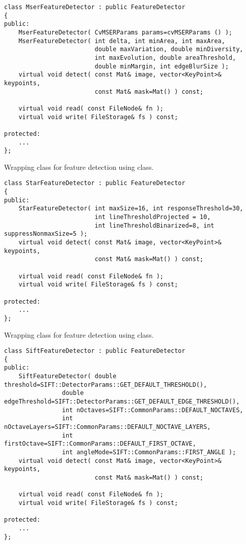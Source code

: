 \begin{lstlisting}
class MserFeatureDetector : public FeatureDetector
{
public:
    MserFeatureDetector( CvMSERParams params=cvMSERParams () );
    MserFeatureDetector( int delta, int minArea, int maxArea, 
                         double maxVariation, double minDiversity,
                         int maxEvolution, double areaThreshold, 
                         double minMargin, int edgeBlurSize );
    virtual void detect( const Mat& image, vector<KeyPoint>& keypoints, 
                         const Mat& mask=Mat() ) const;

    virtual void read( const FileNode& fn );
    virtual void write( FileStorage& fs ) const;

protected:
    ...
};
\end{lstlisting}

Wrapping class for feature detection using  class.

\begin{lstlisting}
class StarFeatureDetector : public FeatureDetector
{
public:
    StarFeatureDetector( int maxSize=16, int responseThreshold=30, 
                         int lineThresholdProjected = 10,
                         int lineThresholdBinarized=8, int suppressNonmaxSize=5 );
    virtual void detect( const Mat& image, vector<KeyPoint>& keypoints, 
                         const Mat& mask=Mat() ) const;

    virtual void read( const FileNode& fn );
    virtual void write( FileStorage& fs ) const;

protected:
    ...
};
\end{lstlisting}

Wrapping class for feature detection using  class.

\begin{lstlisting}
class SiftFeatureDetector : public FeatureDetector
{
public:
    SiftFeatureDetector( double threshold=SIFT::DetectorParams::GET_DEFAULT_THRESHOLD(),
                double edgeThreshold=SIFT::DetectorParams::GET_DEFAULT_EDGE_THRESHOLD(),
                int nOctaves=SIFT::CommonParams::DEFAULT_NOCTAVES,
                int nOctaveLayers=SIFT::CommonParams::DEFAULT_NOCTAVE_LAYERS,
                int firstOctave=SIFT::CommonParams::DEFAULT_FIRST_OCTAVE,
                int angleMode=SIFT::CommonParams::FIRST_ANGLE );
    virtual void detect( const Mat& image, vector<KeyPoint>& keypoints, 
                         const Mat& mask=Mat() ) const;

    virtual void read( const FileNode& fn );
    virtual void write( FileStorage& fs ) const;

protected:
	...
};
\end{lstlisting}

